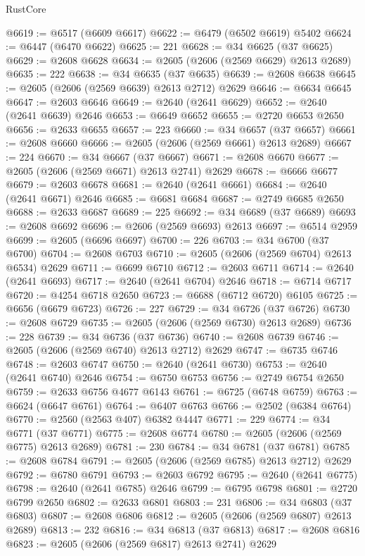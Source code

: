 \begin{lexlean}{RustCore}
\begin{coremodule}
@6619 := @6517 (@6609 @6617)
@6622 := @6479 (@6502 @6619) @5402
@6624 := @6447 (@6470 @6622)
@6625 := 221
@6628 := @34 @6625 (@37 @6625)
@6629 := @2608 @6628
@6634 := @2605 (@2606 (@2569 @6629) @2613 @2689)
@6635 := 222
@6638 := @34 @6635 (@37 @6635)
@6639 := @2608 @6638
@6645 := @2605 (@2606 (@2569 @6639) @2613 @2712) @2629
@6646 := @6634 @6645
@6647 := @2603 @6646
@6649 := @2640 (@2641 @6629)
@6652 := @2640 (@2641 @6639) @2646
@6653 := @6649 @6652
@6655 := @2720 @6653 @2650
@6656 := @2633 @6655
@6657 := 223
@6660 := @34 @6657 (@37 @6657)
@6661 := @2608 @6660
@6666 := @2605 (@2606 (@2569 @6661) @2613 @2689)
@6667 := 224
@6670 := @34 @6667 (@37 @6667)
@6671 := @2608 @6670
@6677 := @2605 (@2606 (@2569 @6671) @2613 @2741) @2629
@6678 := @6666 @6677
@6679 := @2603 @6678
@6681 := @2640 (@2641 @6661)
@6684 := @2640 (@2641 @6671) @2646
@6685 := @6681 @6684
@6687 := @2749 @6685 @2650
@6688 := @2633 @6687
@6689 := 225
@6692 := @34 @6689 (@37 @6689)
@6693 := @2608 @6692
@6696 := @2606 (@2569 @6693) @2613
@6697 := @6514 @2959
@6699 := @2605 (@6696 @6697)
@6700 := 226
@6703 := @34 @6700 (@37 @6700)
@6704 := @2608 @6703
@6710 := @2605 (@2606 (@2569 @6704) @2613 @6534) @2629
@6711 := @6699 @6710
@6712 := @2603 @6711
@6714 := @2640 (@2641 @6693)
@6717 := @2640 (@2641 @6704) @2646
@6718 := @6714 @6717
@6720 := @4254 @6718 @2650
@6723 := @6688 (@6712 @6720) @6105
@6725 := @6656 (@6679 @6723)
@6726 := 227
@6729 := @34 @6726 (@37 @6726)
@6730 := @2608 @6729
@6735 := @2605 (@2606 (@2569 @6730) @2613 @2689)
@6736 := 228
@6739 := @34 @6736 (@37 @6736)
@6740 := @2608 @6739
@6746 := @2605 (@2606 (@2569 @6740) @2613 @2712) @2629
@6747 := @6735 @6746
@6748 := @2603 @6747
@6750 := @2640 (@2641 @6730)
@6753 := @2640 (@2641 @6740) @2646
@6754 := @6750 @6753
@6756 := @2749 @6754 @2650
@6759 := @2633 @6756 @4677 @6143
@6761 := @6725 (@6748 @6759)
@6763 := @6624 (@6647 @6761)
@6764 := @6407 @6763
@6766 := @2502 (@6384 @6764)
@6770 := @2560 (@2563 @407) @6382 @4447
@6771 := 229
@6774 := @34 @6771 (@37 @6771)
@6775 := @2608 @6774
@6780 := @2605 (@2606 (@2569 @6775) @2613 @2689)
@6781 := 230
@6784 := @34 @6781 (@37 @6781)
@6785 := @2608 @6784
@6791 := @2605 (@2606 (@2569 @6785) @2613 @2712) @2629
@6792 := @6780 @6791
@6793 := @2603 @6792
@6795 := @2640 (@2641 @6775)
@6798 := @2640 (@2641 @6785) @2646
@6799 := @6795 @6798
@6801 := @2720 @6799 @2650
@6802 := @2633 @6801
@6803 := 231
@6806 := @34 @6803 (@37 @6803)
@6807 := @2608 @6806
@6812 := @2605 (@2606 (@2569 @6807) @2613 @2689)
@6813 := 232
@6816 := @34 @6813 (@37 @6813)
@6817 := @2608 @6816
@6823 := @2605 (@2606 (@2569 @6817) @2613 @2741) @2629

\end{coremodule}
\end{lexlean}
